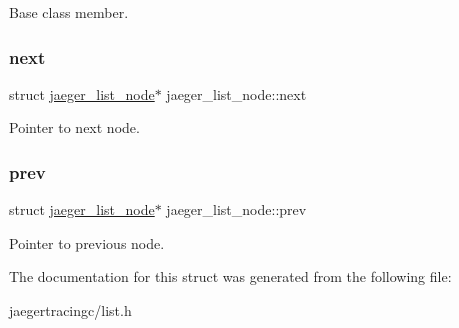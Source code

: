 Base class member. 

\mbox{\label{structjaeger__list__node_a06dd6747b4a3001ea24a0aa33741d126}} 
\subsubsection{\texorpdfstring{next}{next}}
{\footnotesize\ttfamily struct \mbox{\hyperlink{structjaeger__list__node}{jaeger\+\_\+list\+\_\+node}}$\ast$ jaeger\+\_\+list\+\_\+node\+::next}



Pointer to next node. 

\mbox{\label{structjaeger__list__node_a2bb6e6f98c5f2e335ed4e97c2175c78f}} 
\subsubsection{\texorpdfstring{prev}{prev}}
{\footnotesize\ttfamily struct \mbox{\hyperlink{structjaeger__list__node}{jaeger\+\_\+list\+\_\+node}}$\ast$ jaeger\+\_\+list\+\_\+node\+::prev}



Pointer to previous node. 



The documentation for this struct was generated from the following file\+:\begin{DoxyCompactItemize}
\item 
jaegertracingc/list.\+h\end{DoxyCompactItemize}
